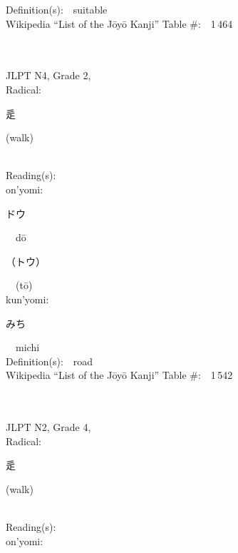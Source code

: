 \begin{multicols}{2}
Definition(s):\ \ suitable \\
Wikipedia ``List of the J\=oy\=o Kanji'' Table \#:\ \ 1\,464 \\
\ \ \\
{\fontsize{34pt}{40pt}  }\ \ \\  %
{JLPT N4, Grade 2, \\Radical:\ \ {\begin{CJK}{UTF8}{min} 辵 \end{CJK}} (walk) } \\
Reading(s):\ \ \\
{\hspace*{1em}}on'yomi:\ \ \\
{\hspace*{2em}}{\begin{CJK}{UTF8}{min} ドウ \end{CJK}}\ \ d\=o\ \ \\
{\hspace*{2em}}{\begin{CJK}{UTF8}{min} （トウ） \end{CJK}}\ \ (t\=o)\ \ \\
{\hspace*{1em}}kun'yomi:\ \ \\
{\hspace*{2em}}{\begin{CJK}{UTF8}{min} みち \end{CJK}}\ \ michi\ \ \\
Definition(s):\ \ road \\
Wikipedia ``List of the J\=oy\=o Kanji'' Table \#:\ \ 1\,542 \\
\ \ \\
{\fontsize{34pt}{40pt}  }\ \ \\  %
{JLPT N2, Grade 4, \\Radical:\ \ {\begin{CJK}{UTF8}{min} 辵 \end{CJK}} (walk) } \\
Reading(s):\ \ \\
{\hspace*{1em}}on'yomi:\ \ \\

\end{multicols}
